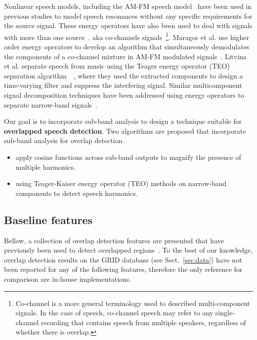 Nonlinear speech models, including the AM-FM speech model~\cite{maragos_kaiser_quatieri} have been used in previous studies to model speech resonances without any specific requirements for the source signal. 
These energy operators have also been used to deal with signals with more than one source~\cite{maragos_instantaneousenergy}, aka co-channels signals~\footnote{Co-channel is a more general terminology used to described multi-component signals. 
In the case of speech, co-channel speech may refer to any single-channel recording that contains speech from multiple speakers, regardless of whether there is overlap.}. 
Maragos et al. use higher order energy operators to develop an algorithm that simultaneously demodulates the components of a co-channel mixture in AM-FM modulated signals~\cite{maragos_instantaneousenergy}. 
Litvina et al. separate speech from music using the Teager energy operator (TEO) separation algorithm~\cite{maragos_kaiser_quatieri}~\cite{Litvin2010}, where they used the extracted components to design a time-varying filter and suppress the interfering signal. 
Similar multicomponent signal decomposition techniques have been addressed using energy operators to separate narrow-band signals~\cite{Linicassp95,hu12_nullspacepersuit,santhanam_maragos_2000}. 

Our goal is to incorporate sub-band analysis to design a technique suitable for {\bf overlapped speech detection}. 
Two algorithms are proposed that incorporate sub-band analysis for overlap detection. 
\begin{itemize}
	\item apply cosine functions across sub-band outputs to magnify the presence of multiple harmonics. 
	\item using Teager-Kaiser energy operator (TEO) methods on narrow-band components to detect speech harmonics. 
\end{itemize}



\subsection{Baseline features}
\label{ssec:baseline}
Bellow, a collection of overlap detection features are presented that have previously been used to detect overlapped regions~\cite{nav_icassp13,boakye_thesis,sapvr_2000}. 
To the best of our knowledge, overlap detection results on the GRID database (see Sect.~\ref{sec:data}) have not been reported for any of the following features, therefore the only reference for comparison are in-house implementations. %

